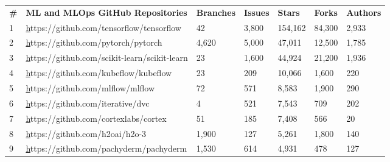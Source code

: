\documentclass{article}
\begin{document}
\begin{table}[ht]
\centering
\begin{tabular}{lllllll}
\textbf{\#} & \textbf{ML and MLOps GitHub Repositories}                                     & \textbf{Branches} & \textbf{Issues} & \textbf{Stars} & \textbf{Forks} & \textbf{Authors} \\
1           & {\color[HTML]{0563C1} {\ul https://github.com/tensorflow/tensorflow}}         & 42                & 3,800           & 154,162        & 84,300         & 2,933            \\
2           & {\color[HTML]{0563C1} {\ul https://github.com/pytorch/pytorch}}               & 4,620             & 5,000           & 47,011         & 12,500         & 1,785            \\
3           & {\color[HTML]{0563C1} {\ul https://github.com/scikit-learn/scikit-learn}}     & 23                & 1,600           & 44,924         & 21,200         & 1,936            \\
4           & {\color[HTML]{0563C1} {\ul https://github.com/kubeflow/kubeflow}}             & 23                & 209             & 10,066         & 1,600          & 220              \\
5           & {\color[HTML]{0563C1} {\ul https://github.com/mlflow/mlflow}}                 & 72                & 571             & 8,583          & 1,900          & 290              \\
6           & {\color[HTML]{0563C1} {\ul https://github.com/iterative/dvc}}                 & 4                 & 521             & 7,543          & 709            & 202              \\
7           & {\color[HTML]{0563C1} {\ul https://github.com/cortexlabs/cortex}}             & 51                & 185             & 7,408          & 566            & 20               \\
8           & {\color[HTML]{0563C1} {\ul https://github.com/h2oai/h2o-3}}                   & 1,900             & 127             & 5,261          & 1,800          & 140              \\
9           & {\color[HTML]{0563C1} {\ul https://github.com/pachyderm/pachyderm}}           & 1,530             & 614             & 4,931          & 478            & 127              \\

\end{tabular}
\end{table}
\end{document}
